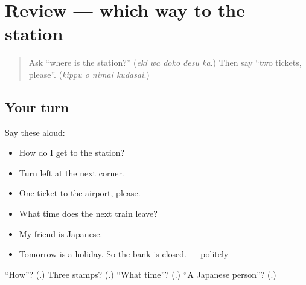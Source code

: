 \section[(review)]{Review — which way to the station}

\label{lesson:JA-R256-which-way-to-the-station}



\begin{quote}
Ask \textquotedblleft{}where is the station?\textquotedblright{} (\emph{eki wa doko desu ka}.) Then say \textquotedblleft{}two tickets, please\textquotedblright{}. (\emph{kippu o nimai kudasai}.)
\end{quote}

\subsection*{Your turn}
Say these aloud:

\begin{itemize}
\raggedright
  \item How do I get to the station?
  \item Turn left at the next corner.
  \item One ticket to the airport, please.
  \item What time does the next train leave?
  \item My friend is Japanese.
  \item Tomorrow is a holiday. So the bank is closed. — politely
\end{itemize}

\begin{tcolorbox}[breakable,colback=teal!4,colframe=teal!35!black,title={Before you move on}]
\textquotedblleft{}How\textquotedblright{}? (\textbf{}.) Three stamps? (\textbf{}.) \textquotedblleft{}What time\textquotedblright{}? (\textbf{}.) \textquotedblleft{}A Japanese person\textquotedblright{}? (\textbf{}.)
\end{tcolorbox}
